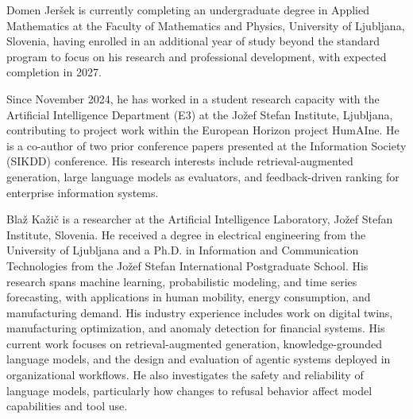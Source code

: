 \documentclass{ieeeaccess}
\begin{document}
\begin{IEEEbiography}{Domen Jer\v{s}ek} is currently completing an undergraduate degree in Applied
Mathematics at the Faculty of Mathematics and Physics, University of Ljubljana,
Slovenia, having enrolled in an additional year of study beyond the standard
program to focus on his research and professional development, with expected
completion in 2027.

Since November 2024, he has worked in a student research capacity with the
Artificial Intelligence Department (E3) at the Jo\v{z}ef Stefan Institute,
Ljubljana, contributing to project work within the European Horizon project
HumAIne. He is a co-author of two prior conference papers presented at the
Information Society (SIKDD) conference. His research interests include
retrieval-augmented generation, large language models as evaluators, and
feedback-driven ranking for enterprise information systems.
\end{IEEEbiography}


\begin{IEEEbiography}{Blaž Kažič} is a researcher at the Artificial Intelligence Laboratory, Jožef Stefan Institute, Slovenia. He received a degree in electrical engineering from the University of Ljubljana and a Ph.D. in Information and Communication Technologies from the Jožef Stefan International Postgraduate School. His research spans machine learning, probabilistic modeling, and time series forecasting, with applications in human mobility, energy consumption, and manufacturing demand. His industry experience includes work on digital twins, manufacturing optimization, and anomaly detection for financial systems. His current work focuses on retrieval-augmented generation, knowledge-grounded language models, and the design and evaluation of agentic systems deployed in organizational workflows. He also investigates the safety and reliability of language models, particularly how changes to refusal behavior affect model capabilities and tool use.
\end{IEEEbiography}
\end{document}
